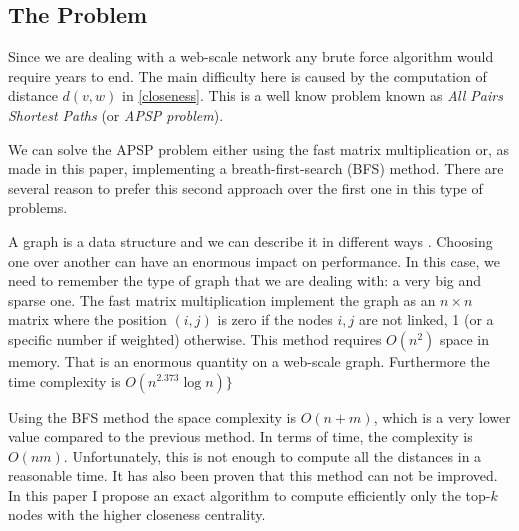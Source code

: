 \clearpage
\subsection{The Problem}

Since we are dealing with a web-scale network any brute force algorithm would require years to end. The main difficulty here is caused by the computation of distance $d(v,w)$ in \eqref{closeness}. This is a well know problem known as \emph{All Pairs Shortest Paths} (or \emph{APSP problem}). \s

\noindent We can solve the APSP problem either using the fast matrix multiplication or, as made in this paper, implementing a breath-first-search (BFS) method. There are several reason to prefer this second approach over the first one in this type of problems. \s

\noindent A graph is a data structure and we can describe it in different ways \cite{skienna08}. Choosing one over another can have an enormous impact on performance. In this case, we need to remember the type of graph that we are dealing with: a very big and sparse one. The fast matrix multiplication implement the graph as an $n\times n$ matrix where the position $(i,j)$ is zero if the nodes $i,j$ are not linked, 1 (or a specific number if weighted) otherwise. This method requires $O(n^2)$ space in memory. That is an enormous quantity on a web-scale graph. Furthermore the time complexity is $O(n^{2.373} \log n)\}$ \cite{10.1145/567112.567114}  \s

\noindent Using the BFS method the space complexity is $O(n+m)$, which is a very lower value compared to the previous method. In terms of time, the complexity is $O(nm)$. Unfortunately, this is not enough to compute all the distances in a reasonable time. It has also been proven that this method can not be improved. In this paper I propose an exact algorithm to compute efficiently only the top-$k$ nodes with the higher closeness centrality.
